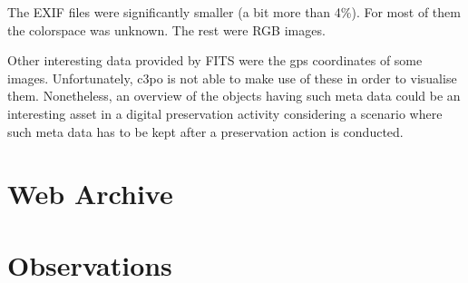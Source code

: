 The EXIF files were significantly smaller (a bit more than 4\%).
For most of them the colorspace was unknown.
The rest were RGB images.

Other interesting data provided by FITS were the gps coordinates of some images.
Unfortunately, c3po is not able to make use of these in order to visualise them.
Nonetheless, an overview of the objects having such meta data could be an interesting asset in a digital preservation activity considering a scenario where such meta data has to be kept after a preservation action is conducted. 

\section{Web Archive}

\section{Observations}